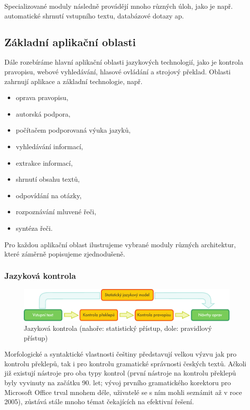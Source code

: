 \begin{multicols}{2}
Specializované moduly následně provádějí mnoho různých úloh, jako je např. automatické shrnutí vstupního textu, databázové dotazy ap.

\subsection{Základní aplikační oblasti}

Dále rozebíráme hlavní aplikační oblasti jazykových technologií, jako je kontrola pravopisu, webové vyhledávání, hlasové ovládání a strojový překlad. Oblasti zahrnují aplikace a základní technologie, např.

\begin{itemize}
\item oprava pravopisu,
\item autorská podpora,
\item počítačem podporovaná výuka jazyků,
\item vyhledávání informací,
\item extrakce informací,
\item shrnutí obsahu textů,
\item odpovídání na otázky,
\item rozpoznávání mluvené řeči,
\item syntéza řeči.
\end{itemize}

Pro každou aplikační oblast ilustrujeme vybrané moduly různých architektur, které záměrně popisujeme zjednodušeně.

\subsubsection{Jazyková kontrola}
\begin{figure}[t]
  \center
  \includegraphics[width=\textwidth]{../_media/czech/language_checking}
  \caption{Jazyková kontrola (nahoře: statistický přístup, dole: pravidlový přístup)}
  \label{fig:langcheckingaarch_cz}
\end{figure}

Morfologické a syntaktické vlastnosti češtiny představují velkou výzvu jak pro kontrolu překlepů, tak i pro kontrolu gramatické správnosti českých textů. Ačkoli již existují nástroje pro oba typy kontrol (první nástroje na kontrolu překlepů byly vyvinuty na začátku 90. let; vývoj prvního gramatického korektoru pro Microsoft Office trval mnohem déle, uživatelé se s ním mohli seznámit až v roce 2005), zůstává stále mnoho témat čekajících na efektivní řešení.


\end{multicols}
